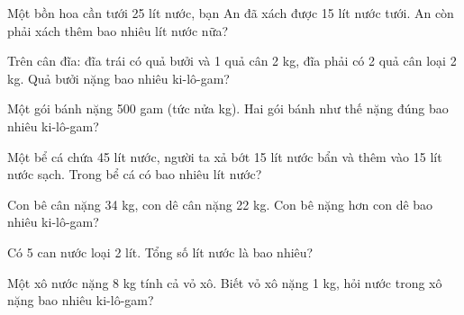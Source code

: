 \begin{ex}
Một bồn hoa cần tưới 25 lít nước, bạn An đã xách được 15 lít nước tưới. An còn phải xách thêm bao nhiêu lít nước nữa?
\end{ex}

\begin{ex}
Trên cân đĩa: đĩa trái có quả bưởi và 1 quả cân 2 kg, đĩa phải có 2 quả cân loại 2 kg. Quả bưởi nặng bao nhiêu ki-lô-gam?
\end{ex}

\begin{ex}
Một gói bánh nặng 500 gam (tức nửa kg). Hai gói bánh như thế nặng đúng bao nhiêu ki-lô-gam?
\end{ex}

\begin{ex}
Một bể cá chứa 45 lít nước, người ta xả bớt 15 lít nước bẩn và thêm vào 15 lít nước sạch. Trong bể cá có bao nhiêu lít nước?
\end{ex}

\begin{ex}
Con bê cân nặng 34 kg, con dê cân nặng 22 kg. Con bê nặng hơn con dê bao nhiêu ki-lô-gam?
\end{ex}

\begin{ex}
Có 5 can nước loại 2 lít. Tổng số lít nước là bao nhiêu?
\end{ex}

\begin{ex}
Một xô nước nặng 8 kg tính cả vỏ xô. Biết vỏ xô nặng 1 kg, hỏi nước trong xô nặng bao nhiêu ki-lô-gam?
\end{ex}
